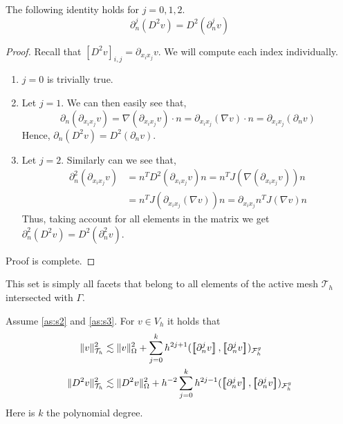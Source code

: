 \begin{proposition}
    \label{prop:hessian_change}
    The following identity holds for $j=0,1,2$.
    $$\partial ^{j}_{n} (D^2v) = D^2 ( \partial ^{j}_{n} v)  $$
\end{proposition}

\begin{proof}
        Recall that $\left[ D^2 v \right]_{i,j} = \partial _{x_{i}x_{j}} v $. We will compute each index individually.
    \begin{enumerate}[label=\arabic*)]
        \item $j = 0$ is trivially true.
        \item Let $j=1$. We can then easily see that, \[
        \partial ^{}_{n} ( \partial _{x_{i} x_{j}} v)  = \nabla  ( \partial _{x_{i} x_{j}} v)  \cdot n = \partial _{x_{i} x_{j}} (\nabla  v)  \cdot n =\partial _{x_{i} x_{j}} (\partial _{n} v)
        \]
        Hence, $\partial _{n} (D^2v) = D^2( \partial _{n}v)$.
        \item Let $j=2$. Similarly can we see that, \[
                \begin{split}
                \partial^{2} _{n} (\partial _{x_{i} x_{j}} v) & = n^{T}  D^2(\partial _{x_{i} x_{j}} v) n = n^{T}  J( \nabla (\partial _{x_{i} x_{j}}v) ) n \\
                & =  n^{T}  J(\partial _{x_{i} x_{j}}(\nabla v) ) n = \partial _{x_{i} x_{j}} n^{T} J(\nabla v) n
                \end{split}
            \]
            Thus, taking account for all elements in the matrix we get $\partial^{2} _{n} (D^2v) = D^2( \partial^{2} _{n}v)$.
    \end{enumerate}
    Proof is complete.

\end{proof}

This set is simply all facets that belong to all elements of the active mesh $\mathcal{T} _{h}$  intersected with $\Gamma $.

\begin{lemma}
    \label{lemma:inv_gh_lemma}
    Assume \ref{as:s2} and \ref{as:s3}.
    For $v \in  V_{h}$ it holds that
        \begin{align}
            \label{eq:inv_gh_1}
        \| v \|_{ \mathcal{T} _{h} }^{ 2 }  & \lesssim  \| v \|_{ \Omega  }^{ 2 }  + \sum_{j=0}^{k} h^{2j+1} ( \jump{ \partial ^{j}_{n} v }, \jump{ \partial ^{j}_{n} v}    )_{\mathcal{F}_{h}^{g}}\\
            \label{eq:inv_gh_2}
        \| D ^2 v \|_{ \mathcal{T} _{h} }^{ 2 }  & \lesssim  \| D^2 v \|_{ \Omega  }^{ 2 }  + h^{-2}\sum_{j=0}^{k} h^{2j-1} ( \jump{ \partial ^{j}_{n} v }, \jump{ \partial ^{j}_{n}v }    )_{\mathcal{F}_{h}^{g}}
        \end{align}
        Here is $k$ the polynomial degree.
\end{lemma}

